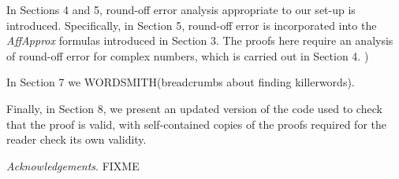 In Sections 4 and 5, round-off error analysis appropriate to our 
set-up is introduced.  Specifically, in Section 5, round-off error is 
incorporated 
into the {\it AffApprox} formulas introduced in Section 3.  The proofs here 
require an analysis of round-off error for complex numbers, which is carried 
out in Section 4.
)

In Section 7 we WORDSMITH(breadcrumbs about finding killerwords).

Finally, in Section 8, we present an updated version of
the code used to check that the proof is valid,
with self-contained copies of the proofs required for the reader check its own validity.

{\it Acknowledgements}.
FIXME

